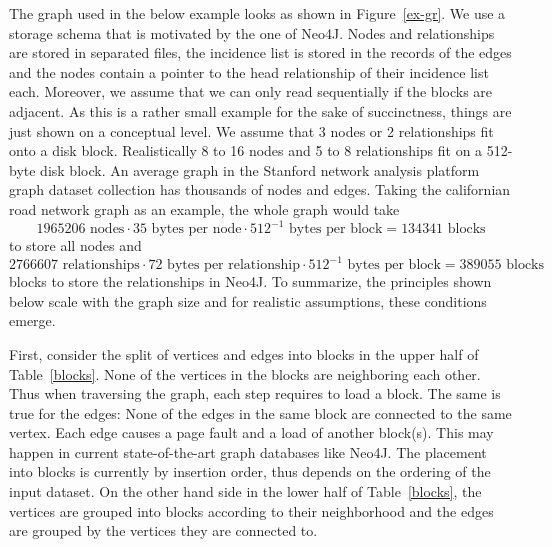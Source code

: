   The graph used in the below example looks as shown in Figure~\ref{ex-gr}.
  We use a storage schema that is motivated by the one of Neo4J.
  Nodes and relationships are stored in separated files, the incidence list is stored in the records of the edges and the nodes contain a pointer to the head relationship of their incidence list each. 
  Moreover, we assume that we can only read sequentially if the blocks are adjacent.
  As this is a rather small example for the sake of succinctness, things are just shown on a conceptual level. 
  We assume that 3 nodes or 2 relationships fit onto a disk block. 
  Realistically 8 to 16 nodes and 5 to 8 relationships fit on a 512-byte disk block. 
  An average graph in the Stanford network analysis platform graph dataset collection has thousands of nodes and edges. 
  Taking the californian road network graph as an example, the whole graph would take 
  \[ 1 965 206 \text{ nodes} \cdot 35 \text{ bytes per node} \cdot 512^{-1} \text{ bytes per block} = 134 341\text{ blocks}\] 
  to store all nodes and 
  \[2 766 607 \text{ relationships} \cdot 72 \text{ bytes per relationship} \cdot 512^{-1} \text{ bytes per block} = 389055\text{ blocks}\] 
  blocks to store the relationships in Neo4J.
  To summarize, the principles shown below scale with the graph size and for realistic assumptions, these conditions emerge.

  First, consider the split of vertices and edges into blocks in the upper half of Table~\ref{blocks}. 
  None of the vertices in the blocks are neighboring each other.
  Thus when traversing the graph, each step requires to load a block.
  The same is true for the edges: 
  None of the edges in the same block are connected to the same vertex. 
  Each edge causes a page fault and a load of another block(s).
  This may happen in current state-of-the-art graph databases like Neo4J. 
  The placement into blocks is currently by insertion order, thus depends on the ordering of the input dataset. 
  On the other hand side in the lower half of Table~\ref{blocks}, the vertices are grouped into blocks according to their neighborhood and the edges are grouped by the vertices they are connected to.

